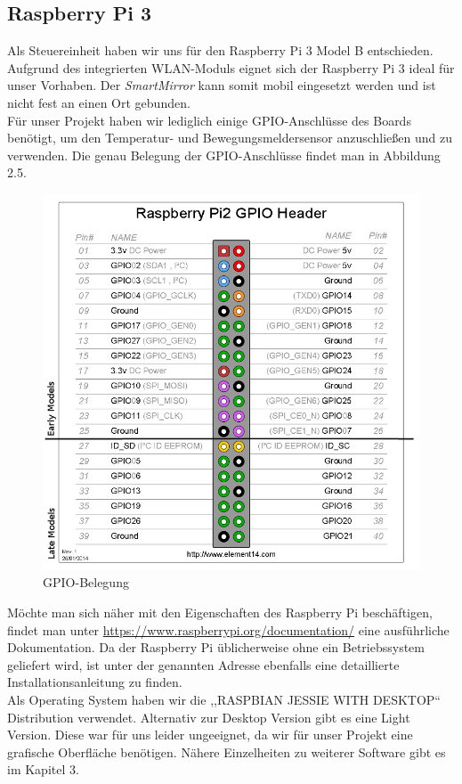 \subsection{Raspberry Pi 3}
Als Steuereinheit haben wir uns für den Raspberry Pi 3 Model B entschieden. Aufgrund des integrierten WLAN-Moduls eignet sich der Raspberry Pi 3 ideal für unser Vorhaben. Der 
\textit{SmartMirror} kann somit mobil eingesetzt werden und ist nicht fest an einen Ort gebunden. \\
Für unser Projekt haben wir lediglich einige GPIO-Anschlüsse des Boards benötigt, um den Temperatur- und Bewegungsmeldersensor anzuschließen und zu verwenden. Die genau Belegung der GPIO-Anschlüsse findet man in Abbildung 2.5.
\begin{figure}[H]
	\includegraphics[scale=0.4]{bilder/gpio_pinout.jpg}
	\caption{GPIO-Belegung}
\end{figure}
Möchte man sich näher mit den Eigenschaften des Raspberry Pi beschäftigen, findet man unter \url{https://www.raspberrypi.org/documentation/} eine ausführliche Dokumentation. Da der Raspberry Pi üblicherweise ohne ein Betriebssystem geliefert wird, ist unter der genannten Adresse ebenfalls eine detaillierte Installationsanleitung zu finden.\\
Als Operating System haben wir die ,,RASPBIAN JESSIE WITH DESKTOP`` Distribution verwendet. Alternativ zur Desktop Version gibt es eine Light Version. Diese war für uns leider ungeeignet, da wir für unser Projekt eine grafische Oberfläche benötigen. Nähere Einzelheiten zu weiterer Software gibt es im Kapitel 3. \\


